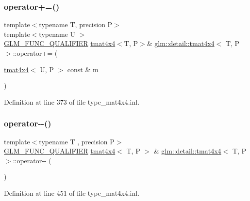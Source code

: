 \subsubsection{\texorpdfstring{operator+=()}{operator+=()}\hspace{0.1cm}{\footnotesize\ttfamily [4/4]}}
{\footnotesize\ttfamily template$<$typename T, precision P$>$ \\
template$<$typename U $>$ \\
\hyperlink{setup_8hpp_a33fdea6f91c5f834105f7415e2a64407}{G\+L\+M\+\_\+\+F\+U\+N\+C\+\_\+\+Q\+U\+A\+L\+I\+F\+I\+ER} \hyperlink{structglm_1_1detail_1_1tmat4x4}{tmat4x4}$<$T, P$>$\& \hyperlink{structglm_1_1detail_1_1tmat4x4}{glm\+::detail\+::tmat4x4}$<$ T, P $>$\+::operator+= (\begin{DoxyParamCaption}\item[{\hyperlink{structglm_1_1detail_1_1tmat4x4}{tmat4x4}$<$ U, P $>$ const \&}]{m }\end{DoxyParamCaption})}



Definition at line 373 of file type\+\_\+mat4x4.\+inl.

\mbox{\label{structglm_1_1detail_1_1tmat4x4_a6a724eae9119c2724ccfdb3f418ab31b}} 
\subsubsection{\texorpdfstring{operator-\/-\/()}{operator--()}\hspace{0.1cm}{\footnotesize\ttfamily [1/2]}}
{\footnotesize\ttfamily template$<$typename T , precision P$>$ \\
\hyperlink{setup_8hpp_a33fdea6f91c5f834105f7415e2a64407}{G\+L\+M\+\_\+\+F\+U\+N\+C\+\_\+\+Q\+U\+A\+L\+I\+F\+I\+ER} \hyperlink{structglm_1_1detail_1_1tmat4x4}{tmat4x4}$<$ T, P $>$ \& \hyperlink{structglm_1_1detail_1_1tmat4x4}{glm\+::detail\+::tmat4x4}$<$ T, P $>$\+::operator-\/-\/ (\begin{DoxyParamCaption}{ }\end{DoxyParamCaption})}



Definition at line 451 of file type\+\_\+mat4x4.\+inl.

\mbox{\label{structglm_1_1detail_1_1tmat4x4_a38f9e3d1a2d4b37646311ce7a798aacd}} 
